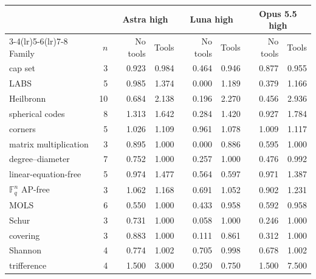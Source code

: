 \begin{tabularx}{\linewidth}{@{}Xrrrrrrr@{}}
\toprule
& & \multicolumn{2}{c}{Astra high} & \multicolumn{2}{c}{Luna high} & \multicolumn{2}{c}{Opus 5.5 high} \\
\cmidrule(lr){3-4}\cmidrule(lr){5-6}\cmidrule(lr){7-8}
Family & $n$ & No tools & Tools & No tools & Tools & No tools & Tools \\
\midrule
cap set & 3 & 0.923 & 0.984 & 0.464 & 0.946 & 0.877 & 0.955 \\
LABS & 5 & 0.985 & 1.374 & 0.000 & 1.189 & 0.379 & 1.166 \\
Heilbronn & 10 & 0.684 & 2.138 & 0.196 & 2.270 & 0.456 & 2.936 \\
spherical codes & 8 & 1.313 & 1.642 & 0.284 & 1.420 & 0.927 & 1.784 \\
corners & 5 & 1.026 & 1.109 & 0.961 & 1.078 & 1.009 & 1.117 \\
matrix multiplication & 3 & 0.895 & 1.000 & 0.000 & 0.886 & 0.595 & 1.000 \\
degree--diameter & 7 & 0.752 & 1.000 & 0.257 & 1.000 & 0.476 & 0.992 \\
linear-equation-free & 5 & 0.974 & 1.477 & 0.564 & 0.597 & 0.971 & 1.387 \\
$\mathbb F_q^n$ AP-free & 3 & 1.062 & 1.168 & 0.691 & 1.052 & 0.902 & 1.231 \\
MOLS & 6 & 0.550 & 1.000 & 0.433 & 0.958 & 0.592 & 0.958 \\
Schur & 3 & 0.731 & 1.000 & 0.058 & 1.000 & 0.246 & 1.000 \\
covering & 3 & 0.883 & 1.000 & 0.111 & 0.861 & 0.312 & 1.000 \\
Shannon & 4 & 0.774 & 1.002 & 0.705 & 0.998 & 0.678 & 1.002 \\
trifference & 4 & 1.500 & 3.000 & 0.250 & 0.750 & 1.500 & 7.500 \\
\bottomrule
\end{tabularx}

